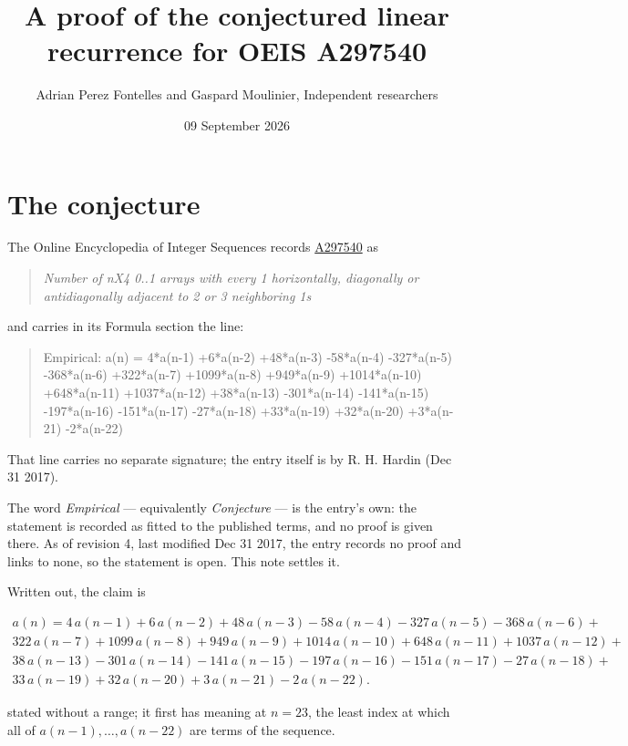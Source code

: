 \documentclass[11pt]{article}
\title{A proof of the conjectured linear recurrence for OEIS A297540}
\author{Adrian Perez Fontelles and Gaspard Moulinier, Independent researchers}
\date{09 September 2026}
\theoremstyle{definition}
\begin{document}
\maketitle
\section{The conjecture}

The Online Encyclopedia of Integer Sequences records \href{https://oeis.org/A297540}{A297540} as

\begin{quote}\itshape Number of nX4 0..1 arrays with every 1 horizontally, diagonally or antidiagonally adjacent to 2 or 3 neighboring 1s\end{quote}

and carries in its Formula section the line:

\begin{quote}\ttfamily Empirical: a(n) = 4*a(n-1) +6*a(n-2) +48*a(n-3) -58*a(n-4) -327*a(n-5) -368*a(n-6) +322*a(n-7) +1099*a(n-8) +949*a(n-9) +1014*a(n-10) +648*a(n-11) +1037*a(n-12) +38*a(n-13) -301*a(n-14) -141*a(n-15) -197*a(n-16) -151*a(n-17) -27*a(n-18) +33*a(n-19) +32*a(n-20) +3*a(n-21) -2*a(n-22)\end{quote}

That line carries no separate signature; the entry itself is by R. H. Hardin (Dec 31 2017).

The word {\itshape Empirical} --- equivalently {\itshape Conjecture} --- is the entry's own: the statement is recorded as fitted to the published terms, and no proof is given there. As of revision 4, last modified Dec 31 2017, the entry records no proof and links to none, so the statement is open. This note settles it.

Written out, the claim is

\begin{multline*} a(n) = 4\,a(n-1) + 6\,a(n-2) + 48\,a(n-3) - 58\,a(n-4) - 327\,a(n-5) - 368\,a(n-6) + \\ 322\,a(n-7) + 1099\,a(n-8) + 949\,a(n-9) + 1014\,a(n-10) + 648\,a(n-11) + 1037\,a(n-12) + \\ 38\,a(n-13) - 301\,a(n-14) - 141\,a(n-15) - 197\,a(n-16) - 151\,a(n-17) - 27\,a(n-18) + \\ 33\,a(n-19) + 32\,a(n-20) + 3\,a(n-21) - 2\,a(n-22). \end{multline*}

stated without a range; it first has meaning at $n = 23$, the least index at which all of $a(n-1),\dots,a(n-22)$ are terms of the sequence.
\end{document}
